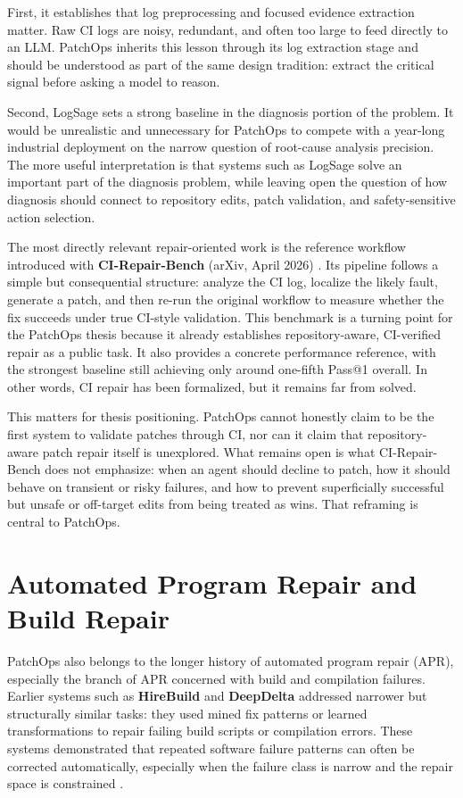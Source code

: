 First, it establishes that log preprocessing and focused evidence extraction matter. Raw CI logs are noisy,
redundant, and often too large to feed directly to an LLM. PatchOps inherits this lesson through its log
extraction stage and should be understood as part of the same design tradition: extract the critical signal
before asking a model to reason.

Second, LogSage sets a strong baseline in the diagnosis portion of the problem. It would be unrealistic and
unnecessary for PatchOps to compete with a year-long industrial deployment on the narrow question of root-cause
analysis precision. The more useful interpretation is that systems such as LogSage solve an important part of
the diagnosis problem, while leaving open the question of how diagnosis should connect to repository edits,
patch validation, and safety-sensitive action selection.

The most directly relevant repair-oriented work is the reference workflow introduced with
\textbf{CI-Repair-Bench} (arXiv, April 2026) \cite{cirepairbench2026}. Its pipeline follows a simple but consequential structure:
analyze the CI log, localize the likely fault, generate a patch, and then re-run the original workflow to
measure whether the fix succeeds under true CI-style validation. This benchmark is a turning point for the
PatchOps thesis because it already establishes repository-aware, CI-verified repair as a public task. It also
provides a concrete performance reference, with the strongest baseline still achieving only around one-fifth
Pass@1 overall. In other words, CI repair has been formalized, but it remains far from solved.

This matters for thesis positioning. PatchOps cannot honestly claim to be the first system to validate patches
through CI, nor can it claim that repository-aware patch repair itself is unexplored. What remains open is what
CI-Repair-Bench does not emphasize: when an agent should decline to patch, how it should behave on transient or
risky failures, and how to prevent superficially successful but unsafe or off-target edits from being treated as
wins. That reframing is central to PatchOps.

\section{Automated Program Repair and Build Repair}

PatchOps also belongs to the longer history of automated program repair (APR), especially the branch of APR
concerned with build and compilation failures. Earlier systems such as \textbf{HireBuild} and
\textbf{DeepDelta} addressed narrower but structurally similar tasks: they used mined fix patterns or learned
transformations to repair failing build scripts or compilation errors. These systems demonstrated that repeated
software failure patterns can often be corrected automatically, especially when the failure class is narrow and
the repair space is constrained \cite{hirebuild2018,deepdelta2019}.

